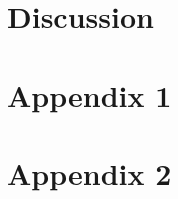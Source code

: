 \documentclass[preprint]{revtex4-1}
\begin{document}
    \section{Discussion}


    \section{Appendix 1}


    \section{Appendix 2}


    
\end{document}
